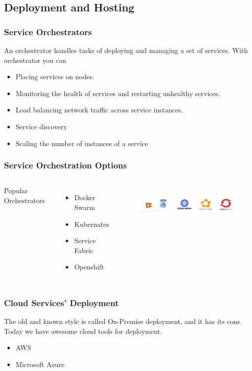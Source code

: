 \documentclass{beamer}
\begin{document}
	\subsection {Deployment and Hosting}
		\begin{frame}
			\frametitle{Service Orchestrators}
				An orchestrator handles tasks of deploying and managing a set of services. With orchestrator you can 
				\begin{itemize}
					\item<1-> Placing services on nodes. 
					\item<2-> Monitoring the health of services and restarting unhealthy services.
					\item<3-> Load balancing network traffic across service instances. 
					\item<4-> Service discovery
					\item<5-> Scaling the number of instances of a service
				\end{itemize}
			\vspace{100mm}
		\end{frame}
	
		\begin{frame}
			\frametitle{Service Orchestration Options}
				\begin{columns}[c]
					\column{.30\textwidth} 
						Popular Orchestrators
						\begin{itemize}
							\item Docker Swarm
							\item Kubernates
							\item Service Fabric
							\item Openshift
						\end{itemize}
					
						\begin{figure}[h]
							\includegraphics[width=70mm, height=20mm, scale=1]{img/service-orch.png}
						\end{figure}\vspace{1mm}
				\end{columns}
			
		\end{frame}
	
		\begin{frame}
			\frametitle{Cloud Services' Deployment}
				The old and known style is called On-Premise deployment, and it has its cons.\\
				Today we have awesome cloud tools for deployment.
				\begin{itemize}
					\item AWS
					\item Microsoft Azure
				\end{itemize}
				\vspace{100mm}
		\end{frame}
\end{document}
